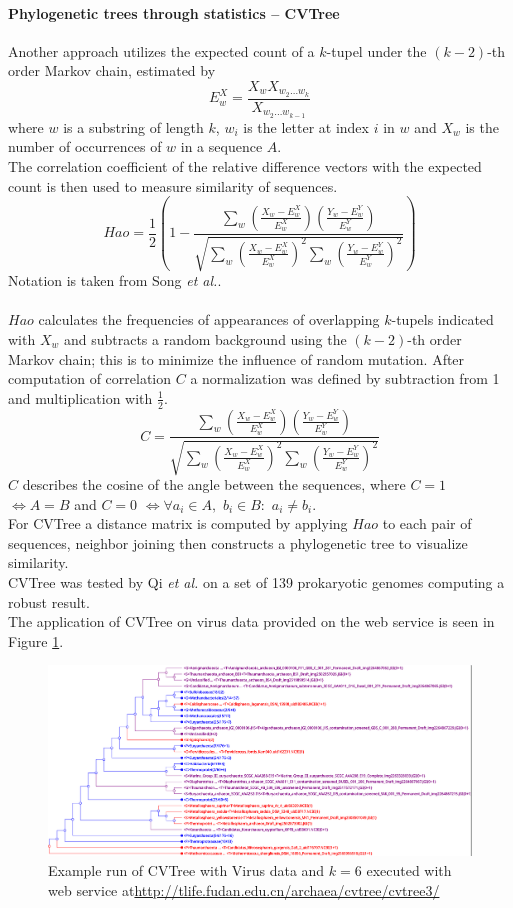 \documentclass[twocolumn]{bmcart}%
\begin{document}
\paragraph*{Phylogenetic trees through statistics -- CVTree}
Another approach utilizes the expected count of a $k$-tupel under the $(k-2)$-th order Markov chain, estimated by 
$$E_w^X=\frac{X_wX_{w_2\dots w_k}}{X_{w_2\dots w_{k-1}}}$$
where $w$ is a substring of length $k$, $w_i$ is the letter at index $i$ in $w$ and $X_w$ is the number of occurrences of $w$ in a sequence $A$.\\
The correlation coefficient of the relative difference vectors with the expected count is then used to measure similarity of sequences.
$$Hao=\frac{1}{2}\left(1-\frac{\sum_w\left(\frac{X_w-E_w^X}{E_w^X}\right)\left(\frac{Y_w-E_w^Y}{E_w^Y}\right)}{\sqrt{\sum_w\left(\frac{X_w-E_w^X}{E_w^X}\right)^2\sum_w\left(\frac{Y_w-E_w^Y}{E_w^Y}\right)^2}}\right)$$
Notation is taken from Song \textit{et al.}\cite{doi:10.1093/bib/bbt067}.\\
\\
$Hao$ calculates the frequencies of appearances of overlapping $k$-tupels indicated with $X_w$ and subtracts a random background using the $(k-2)$-th order Markov chain; this is to minimize the influence of random mutation. After computation of correlation $C$ a normalization was defined by subtraction from 1 and multiplication with $\frac{1}{2} $.
$$C=\frac{\sum_w\left(\frac{X_w-E_w^X}{E_w^X}\right)\left(\frac{Y_w-E_w^Y}{E_w^Y}\right)}{\sqrt{\sum_w\left(\frac{X_w-E_w^X}{E_w^X}\right)^2\sum_w\left(\frac{Y_w-E_w^Y}{E_w^Y}\right)^2}}$$
$C$ describes the cosine of the angle between the sequences, where $C=1$ $\Leftrightarrow A=B$ and $C=0$ $\Leftrightarrow \forall a_i \in A,$ $b_i \in B:$ $a_i \neq b_i$. \\
For CVTree a distance matrix is computed by applying $Hao$ to each pair of sequences, neighbor joining then constructs a phylogenetic tree to visualize similarity.\\
CVTree was tested by Qi \textit{et al.} on a set of 139 prokaryotic genomes computing a robust result\cite{qi2004cvtree}. \\
The application of CVTree on virus data provided on the web service is seen in Figure \ref{img:cvtree}.
\begin{figure}
	\centering
	\includegraphics[width=.99\textwidth]{bilder/CVTree.png}
	\caption{Example run of CVTree with Virus data and $k=6$ executed with web service at\newline \url{http://tlife.fudan.edu.cn/archaea/cvtree/cvtree3/} \cite{qi2004whole,zuo2015cvtree3}}
	\label{img:cvtree}
\end{figure}%
\end{document}
